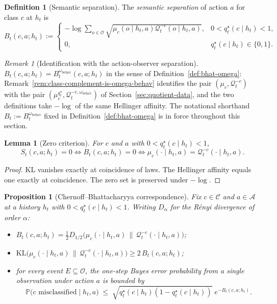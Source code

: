 \documentclass[11pt]{article}
\newtheorem{proposition}[theorem]{Proposition}
\newtheorem{lemma}[theorem]{Lemma}
\theoremstyle{definition}
\newtheorem{definition}[theorem]{Definition}
\theoremstyle{remark}
\newtheorem{remark}[theorem]{Remark}
\newcommand{\Acal}{\mathcal{A}}
\newcommand{\Ccal}{\mathcal{C}}
\newcommand{\Ocal}{\mathcal{O}}
\newcommand{\Qcal}{\mathcal{Q}}
\newcommand{\Prob}{\mathbb{P}}
\newcommand{\KL}{\mathrm{KL}}
\begin{document}
\begin{definition}[Semantic separation]
\label{def:semantic-separation}
The \emph{semantic separation} of action $a$ for class $c$ at $h_t$ is
\[
B_t(c,a;h_t)
:=
\begin{cases}
-\log\sum_{o\in\Ocal}\sqrt{\mu_c(o\mid h_t,a)\Qcal_t^{-c}(o\mid h_t,a)}, & 0<q_t^\star(c\mid h_t)<1,\\
0, & q_t^\star(c\mid h_t)\in\{0,1\}.
\end{cases}
\]
\end{definition}

\begin{remark}[Identification with the action-observer separation]
\label{rem:B-is-B-omega-behav}
$B_t(c,a;h_t)=B_t^{\omega_{\mathrm{behav}}}(c,a;h_t)$ in the sense of Definition~\ref{def:bhat-omega}: Remark~\ref{rem:class-complement-is-omega-behav} identifies the pair $(\mu_c,\Qcal_t^{-c})$ with the pair $(\mu_c^{q_t^\star},\Qcal_t^{-c,\omega_{\mathrm{behav}}})$ of Section~\ref{sec:quotient-data}, and the two definitions take $-\log$ of the same Hellinger affinity. The notational shorthand $B_t:=B_t^{\omega_{\mathrm{behav}}}$ fixed in Definition~\ref{def:bhat-omega} is in force throughout this section.
\end{remark}

\begin{lemma}[Zero criterion]
\label{lem:zero-criterion}
For $c$ and $a$ with $0<q_t^\star(c\mid h_t)<1$,
\[
S_t(c,a;h_t)=0
\iff
B_t(c,a;h_t)=0
\iff
\mu_c(\cdot\mid h_t,a)=\Qcal_t^{-c}(\cdot\mid h_t,a).
\]
\end{lemma}

\begin{proof}
KL vanishes exactly at coincidence of laws. The Hellinger affinity equals one exactly at coincidence. The zero set is preserved under $-\log$.
\end{proof}

\begin{proposition}[Chernoff--Bhattacharyya correspondence]
\label{prop:chernoff-correspondence}
Fix $c\in\Ccal$ and $a\in\Acal$ at a history $h_t$ with $0<q_t^\star(c\mid h_t)<1$. Writing $D_\alpha$ for the R\'enyi divergence of order $\alpha$:
\begin{itemize}
\item[\textup{(i)}] $B_t(c,a;h_t)=\tfrac{1}{2}D_{1/2}\!\bigl(\mu_c(\cdot\mid h_t,a)\,\|\,\Qcal_t^{-c}(\cdot\mid h_t,a)\bigr)$;
\item[\textup{(ii)}] $\KL\!\bigl(\mu_c(\cdot\mid h_t,a)\,\|\,\Qcal_t^{-c}(\cdot\mid h_t,a)\bigr)\ge 2\,B_t(c,a;h_t)$;
\item[\textup{(iii)}] for every event $E\subseteq\Ocal$, the one-step Bayes error probability from a single observation under action $a$ is bounded by
\[
\Prob\!\bigl(\text{$c$ misclassified}\mid h_t,a\bigr)\;\le\;\sqrt{q_t^\star(c\mid h_t)(1-q_t^\star(c\mid h_t))}\;e^{-B_t(c,a;h_t)}.
\]
\end{itemize}
\end{proposition}
\end{document}
